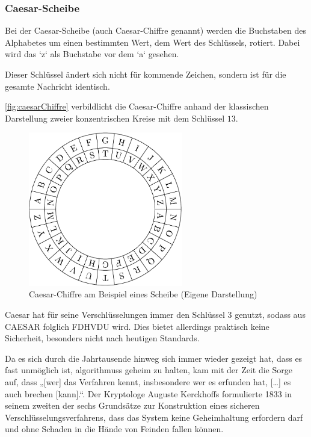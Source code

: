 \subsubsection{Caesar-Scheibe}\label{subsubsec:caesar-chiffre}
Bei der Caesar-Scheibe (auch Caesar-Chiffre genannt) werden die Buchstaben des Alphabetes
um einen bestimmten Wert, dem Wert des Schlüssels, rotiert.
Dabei wird das `z` als Buchstabe vor dem `a` gesehen.

Dieser Schlüssel ändert sich nicht für kommende Zeichen, sondern ist für die gesamte Nachricht identisch.

\autoref{fig:caesarChiffre} verbildlicht die Caesar-Chiffre anhand der klassischen Darstellung zweier konzentrischen Kreise mit dem Schlüssel $13$.
\begin{figure}[htbp]
    \includegraphics[width=0.6\textwidth]{abbildungen/caesar-chiffre}
    \centering
    \caption[
        Caesar-Chifre am Beispiel einer Scheibe]{Caesar-Chiffre am Beispiel eines Scheibe (Eigene Darstellung)}
    \label{fig:caesarChiffre}
\end{figure}

Caesar hat für seine Verschlüsselungen immer den Schlüssel 3 genutzt\autocite[]{beutelspacher_kurze_2017}, sodass aus CAESAR folglich FDHVDU wird.
Dies bietet allerdings praktisch keine Sicherheit, besonders nicht nach heutigen Standards.

Da es sich durch die Jahrtausende hinweg sich immer wieder gezeigt hat, dass es fast unmöglich ist, \glspl{algorithmus} geheim zu halten, kam mit der Zeit die Sorge auf, dass „[wer] das Verfahren kennt, insbesondere wer es erfunden hat, […] es auch brechen [kann].“\autocite{beutelspacher_kurze_2017}.
Der Kryptologe Auguste Kerckhoffs formulierte 1833 in seinem zweiten der sechs Grundsätze zur Konstruktion eines sicheren Verschlüsselungsverfahrens, dass das System keine Geheimhaltung erfordern darf und ohne Schaden in die Hände von Feinden fallen können.\autocite[Übersetzt aus dem Französischen]{petitcolas_information_nodate}

